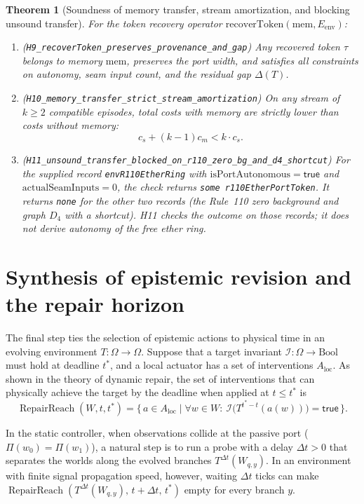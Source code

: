 \documentclass[11pt,a4paper]{article}
\theoremstyle{cleanthm}
\newtheorem{theorem}{Theorem}[section]
\DeclareMathOperator{\RepairReach}{RepairReach}
\DeclareRobustCommand{\id}[1]{\allowbreak\nolinkurl{#1}\allowbreak}
\begin{document}
\begin{theorem}[Soundness of memory transfer, stream amortization, and blocking unsound transfer]
\label{thm:h9_h11_memory}
For the token recovery operator $\mathrm{recoverToken}(\mathrm{mem},E_{\mathrm{env}})$:
\begin{enumerate}
\item (\id{H9_recoverToken_preserves_provenance_and_gap}) Any recovered token $\tau$ belongs to memory $\mathrm{mem}$, preserves the port width, and satisfies all constraints on autonomy, seam input count, and the residual gap $\Delta(T)$.
\item (\id{H10_memory_transfer_strict_stream_amortization}) On any stream of $k\ge2$ compatible episodes, total costs with memory are strictly lower than costs without memory:
\begin{equation}
c_s+(k-1)c_m<k\cdot c_s.
\end{equation}
\item (\id{H11_unsound_transfer_blocked_on_r110_zero_bg_and_d4_shortcut}) For the supplied record \id{envR110EtherRing} with $\mathrm{isPortAutonomous}=\mathsf{true}$ and $\mathrm{actualSeamInputs}=0$, the check returns \id{some r110EtherPortToken}. It returns \id{none} for the other two records (the Rule~110 zero background and graph $D_4$ with a shortcut). H11 checks the outcome on those records; it does not derive autonomy of the free ether ring.
\end{enumerate}
\end{theorem}

\section{Synthesis of epistemic revision and the repair horizon}

The final step ties the selection of epistemic actions to physical time in an evolving environment $T:\Omega\to\Omega$. Suppose that a target invariant $\mathcal I:\Omega\to\mathrm{Bool}$ must hold at deadline $t^*$, and a local actuator has a set of interventions $A_{\mathrm{loc}}$. As shown in the theory of dynamic repair, the set of interventions that can physically achieve the target by the deadline when applied at $t\le t^*$ is
\begin{equation}
  \RepairReach(W,t,t^*) = \bigl\{\, a\in A_{\mathrm{loc}} \;\big|\; \forall w\in W:\ \mathcal{I}\bigl(T^{t^*-t}(a(w))\bigr)=\mathsf{true} \,\bigr\}.
\end{equation}

In the static controller, when observations collide at the passive port ($\Pi(w_0)=\Pi(w_1)$), a natural step is to run a probe with a delay $\Delta t>0$ that separates the worlds along the evolved branches $T^{\Delta t}(W_{q,y})$. In an environment with finite signal propagation speed, however, waiting $\Delta t$ ticks can make $\RepairReach(T^{\Delta t}(W_{q,y}),\,t+\Delta t,\,t^*)$ empty for every branch $y$.
\end{document}

